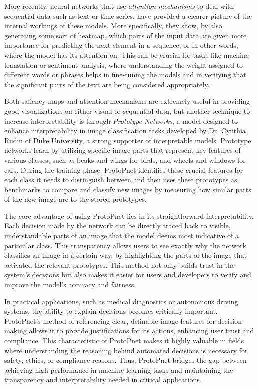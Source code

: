 \documentclass[10pt]{article}
\begin{document}
    More recently, neural networks that use \textit{attention mechanisms} to deal with sequential data such as text or time-series, have provided a clearer picture of the internal workings of these models. More specifically, they show, by also generating some sort of heatmap, which parts of the input data are given more importance for predicting the next element in a sequence, or in other words, where the model has its attention on. This can be crucial for tasks like machine translation or sentiment analysis, where understanding the weight assigned to different words or phrases helps in fine-tuning the models and in verifying that the significant parts of the text are being considered appropriately. 

    Both saliency maps and attention mechanisms are extremely useful in providing good visualizations on either visual or sequential data, but another technique to increase interpretability is through \textit{Prototype Networks}, a model designed to enhance interpretability in image classification tasks developed by Dr. Cynthia Rudin of Duke University, a strong supporter of interpretable models. Prototype networks learn by utilizing specific image parts that represent key features of various classes, such as beaks and wings for birds, and wheels and windows for cars. During the training phase, ProtoPnet identifies these crucial features for each class it needs to distinguish between and then uses these prototypes as benchmarks to compare and classify new images by measuring how similar parts of the new image are to the stored prototypes.

    The core advantage of using ProtoPnet lies in its straightforward interpretability. Each decision made by the network can be directly traced back to visible, understandable parts of an image that the model deems most indicative of a particular class. This transparency allows users to see exactly why the network classifies an image in a certain way, by highlighting the parts of the image that activated the relevant prototypes. This method not only builds trust in the system's decisions but also makes it easier for users and developers to verify and improve the model's accuracy and fairness.

    In practical applications, such as medical diagnostics or autonomous driving systems, the ability to explain decisions becomes critically important. ProtoPnet's method of referencing clear, definable image features for decision-making allows it to provide justifications for its actions, enhancing user trust and compliance. This characteristic of ProtoPnet makes it highly valuable in fields where understanding the reasoning behind automated decisions is necessary for safety, ethics, or compliance reasons. Thus, ProtoPnet bridges the gap between achieving high performance in machine learning tasks and maintaining the transparency and interpretability needed in critical applications.
\end{document}
